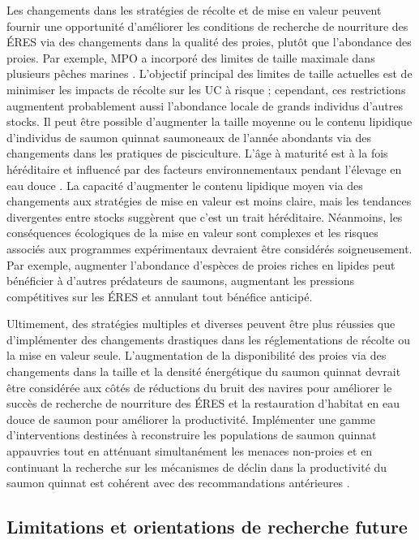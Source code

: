 Les changements dans les stratégies de récolte et de mise en valeur peuvent fournir une opportunité d'améliorer les conditions de recherche de nourriture des ÉRES via des changements dans la qualité des proies, plutôt que l'abondance des proies. Par exemple, MPO a incorporé des limites de taille maximale dans plusieurs pêches marines \citep{dfoPacificRegionFinal2023}. L'objectif principal des limites de taille actuelles est de minimiser les impacts de récolte sur les UC à risque ; cependant, ces restrictions augmentent probablement aussi l'abondance locale de grands individus d'autres stocks. Il peut être possible d'augmenter la taille moyenne ou le contenu lipidique d'individus de saumon quinnat saumoneaux de l'année abondants via des changements dans les pratiques de pisciculture. L'âge à maturité est à la fois héréditaire \citep{mckinneyYchromosomeHaplotypesAre2020} et influencé par des facteurs environnementaux pendant l'élevage en eau douce \citep{larsenGrowthModulationAlters2006}. La capacité d'augmenter le contenu lipidique moyen via des changements aux stratégies de mise en valeur est moins claire, mais les tendances divergentes entre stocks suggèrent que c'est un trait héréditaire. Néanmoins, les conséquences écologiques de la mise en valeur sont complexes et les risques associés aux programmes expérimentaux devraient être considérés soigneusement. Par exemple, augmenter l'abondance d'espèces de proies riches en lipides peut bénéficier à d'autres prédateurs de saumons, augmentant les pressions compétitives sur les ÉRES et annulant tout bénéfice anticipé.

Ultimement, des stratégies multiples et diverses peuvent être plus réussies que d'implémenter des changements drastiques dans les réglementations de récolte ou la mise en valeur seule. L'augmentation de la disponibilité des proies via des changements dans la taille et la densité énergétique du saumon quinnat devrait être considérée aux côtés de réductions du bruit des navires pour améliorer le succès de recherche de nourriture des ÉRES et la restauration d'habitat en eau douce de saumon pour améliorer la productivité. Implémenter une gamme d'interventions destinées à reconstruire les populations de saumon quinnat appauvries tout en atténuant simultanément les menaces non-proies et en continuant la recherche sur les mécanismes de déclin dans la productivité du saumon quinnat est cohérent avec des recommandations antérieures \citep{hilbornEffectsSalmonFisheries2012}.

\subsection{Limitations et orientations de recherche future}

